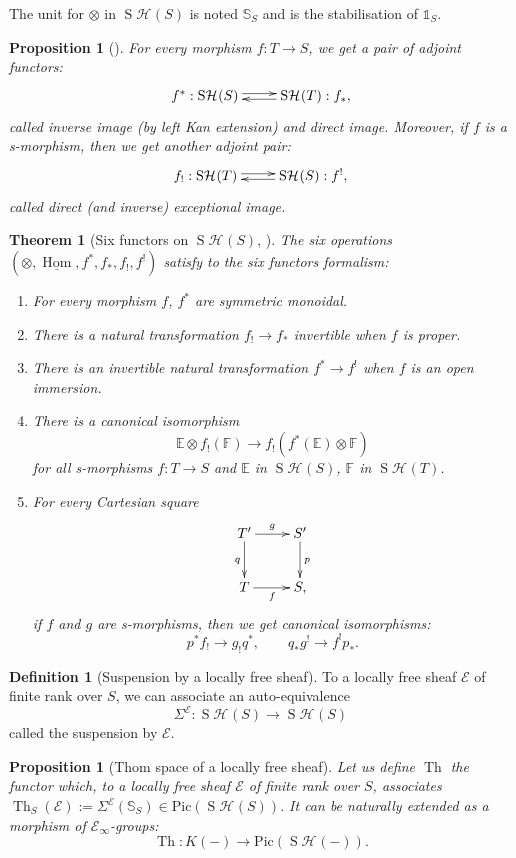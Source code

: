 \documentclass{amsart}
\theoremstyle{plain}%
\newtheorem{tho}[subsubsection]{Theorem}
\newtheorem{prop}[subsubsection]{Proposition}
\theoremstyle{remark}
\theoremstyle{definition}
\newtheorem{deff}[subsubsection]{Definition}
\newcommand{\cE}{\mathcal{E}}
\newcommand{\cH}{\mathcal{H}}
\newcommand{\eE}{\mathbb{E}}
\newcommand{\eF}{\mathbb{F}}
\newcommand{\eS}{\mathbb{S}}
\newcommand{\eUn}{\mathbb{1}}
\newcommand{\Thom}[2][]{\operatorname{Th}_{#1}\left(#2\right)}
\newcommand{\StableHo}[2][]{\operatorname{S}\!\cH^{#1}\!\left(#2\right)}
\newcommand{\Picard}[1]{\mathrm{Pic}\left(#1\right)}
\begin{document}
The unit for $\otimes$ in $\StableHo{S}$ is noted $\eS_S$ and is the stabilisation of $\eUn_S$.

\begin{prop}[\cite{Ayoub_6foncteurs}]
For every morphism $f : T \to S$, we get a pair of adjoint functors:
\[\xymatrix{f^\ast : \StableHo{S} \ar@<+2pt>[r] & \StableHo{T} : f_\ast, \ar@<+2pt>[l]}\]
called inverse image (by left Kan extension) and direct image. Moreover, if $f$ is a s-morphism, then we get another adjoint pair:
\[\xymatrix{f_! : \StableHo{T} \ar@<+2pt>[r] & \StableHo{S} : f^!, \ar@<+2pt>[l]}\]
called direct (and inverse) exceptional image.
\end{prop}

\begin{tho}[Six functors on $\StableHo{S}$, \cite{Ayoub_6foncteurs}]\label{THO - formalisme six foncteurs SH}
The six operations $(\otimes,\underline{\operatorname{Hom}},f^\ast,f_\ast,f_!,f^!)$ satisfy to the six functors formalism:
\begin{enumerate}
\item For every morphism $f$, $f^\ast$ are symmetric monoidal.
\item There is a natural transformation $f_! \to f_\ast$ invertible when $f$ is proper.
\item There is an invertible natural transformation $f^\ast \to f^!$ when $f$ is an open immersion.
\item There is a canonical isomorphism
\[\eE \otimes f_!(\eF) \to f_!(f^\ast(\eE)\otimes \eF)\]
for all s-morphisms $f : T \to S$ and $\eE$ in $\StableHo{S}$, $\eF$ in $\StableHo{T}$.
\item For every Cartesian square
\[\xymatrix{T' \ar[r]^g \ar[d]_q & S' \ar[d]^p \\ T\ar[r]_f & S,}\]
if $f$ and $g$ are s-morphisms, then we get canonical isomorphisms:
\[p^\ast f_! \to g_!q^\ast, \qquad q_\ast g^! \to f^!p_\ast.\]
\end{enumerate}
\end{tho}


\begin{deff}[Suspension by a locally free sheaf]\label{DEF - suspension par faisceau localement libre}
To a locally free sheaf $\cE$ of finite rank over $S$, we can associate an auto-equivalence 
\[\Sigma^\cE : \StableHo{S} \to \StableHo{S}\]
called the suspension by $\cE.$
\end{deff}

\begin{prop}[Thom space of a locally free sheaf]\label{PROP - def foncteur Thom}
Let us define $\operatorname{Th}$ the functor which, to a locally free sheaf $\cE$ of finite rank over $S$, associates $\Thom[S]{\cE} := \Sigma^\cE(\eS_S)\in \Picard{\StableHo{S}}.$ It can be naturally extended as a morphism of $\cE_\infty$-groups:
\[\operatorname{Th}: K(-) \to \Picard{\StableHo{-}}.\]
\end{prop}
\end{document}
